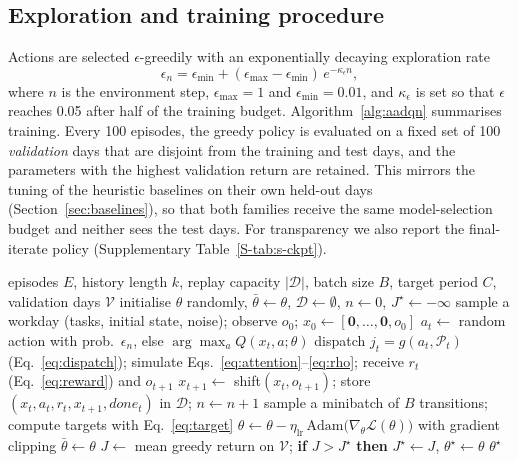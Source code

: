 \subsection{Exploration and training procedure}
Actions are selected $\epsilon$-greedily with an exponentially decaying exploration rate
\begin{equation}
\epsilon_n=\epsilon_{\min}+(\epsilon_{\max}-\epsilon_{\min})\,e^{-\kappa_\epsilon n},
\label{eq:eps}
\end{equation}
where $n$ is the environment step, $\epsilon_{\max}=1$ and $\epsilon_{\min}=0.01$, and $\kappa_\epsilon$ is set so that $\epsilon$ reaches 0.05 after half of the training budget. Algorithm~\ref{alg:aadqn} summarises training. Every 100 episodes, the greedy policy is evaluated on a fixed set of 100 \emph{validation} days that are disjoint from the training and test days, and the parameters with the highest validation return are retained. This mirrors the tuning of the heuristic baselines on their own held-out days (Section~\ref{sec:baselines}), so that both families receive the same model-selection budget and neither sees the test days. For transparency we also report the final-iterate policy (Supplementary Table~\ref{S-tab:s-ckpt}).

\begin{algorithm}[t]
\caption{Training of the attention-aware DQN (AA-DQN).}
\label{alg:aadqn}
\small
\begin{algorithmic}[1]
\Require episodes $E$, history length $k$, replay capacity $|\mathcal D|$, batch size $B$, target period $C$, validation days $\mathcal V$
\State initialise $\theta$ randomly, $\bar\theta\gets\theta$, $\mathcal D\gets\emptyset$, $n\gets0$, $J^\star\gets-\infty$
  \State sample a workday (tasks, initial state, noise); observe $o_0$; $x_0\gets[\mathbf 0,\dots,\mathbf 0,o_0]$
    \State $a_t\gets$ random action with prob.\ $\epsilon_n$, else $\arg\max_a Q(x_t,a;\theta)$
    \State dispatch $j_t=g(a_t,\mathcal P_t)$ (Eq.~\eqref{eq:dispatch}); simulate Eqs.~\eqref{eq:attention}--\eqref{eq:rho}; receive $r_t$ (Eq.~\eqref{eq:reward}) and $o_{t+1}$
    \State $x_{t+1}\gets$ shift$(x_t,o_{t+1})$; store $(x_t,a_t,r_t,x_{t+1},\textit{done}_t)$ in $\mathcal D$; $n\gets n+1$
      \State sample a minibatch of $B$ transitions; compute targets with Eq.~\eqref{eq:target}
      \State $\theta\gets\theta-\eta_{\mathrm{lr}}\,\mathrm{Adam}\big(\nabla_\theta\mathcal L(\theta)\big)$ with gradient clipping
    \EndIf
     $\bar\theta\gets\theta$ \EndIf
  \EndFor
    \State $J\gets$ mean greedy return on $\mathcal V$; \textbf{if} $J>J^\star$ \textbf{then} $J^\star\gets J$, $\theta^\star\gets\theta$
  \EndIf
\EndFor
\State \Return $\theta^\star$
\end{algorithmic}
\end{algorithm}

